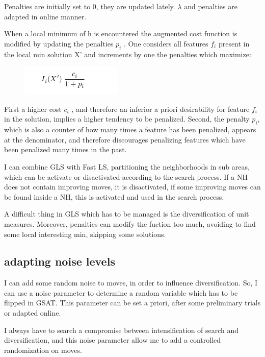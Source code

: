 \documentclass[11pt]{article}
\begin{document}
Penalties are initially set to 0, they are updated lately. $ \lambda $ and penalties are adapted in online manner. 

When a local minimum of h is encountered the augmented cost function is modified by updating the penalties $ p_i $ . One considers all features $ f_i $ present in the local min solution X' and increments by one the penalties which maximize:

\begin{figure}[H]
\includegraphics[scale=0.50]{penalties}
\centering
\end{figure}

First a higher cost $ c_i $ , and therefore an inferior a priori desirability for feature $ f_i $ in the solution, implies a higher tendency to be penalized.
Second, the penalty $ p_i $, which is also a counter of how many times a feature has been penalized, appears at the denominator, and therefore discourages penalizing features which have been penalized many times in the past.

I can combine GLS with Fast LS, partitioning the neighborhoods in sub areas, which can be activate or disactivated according to the search process. If a NH does not contain improving moves, it is disactivated, if some improving moves can be found inside a NH, this is activated and used in the search process. 

A difficult thing in GLS which has to be managed is the diversification of unit measures. Moreover, penalties can modify the fuction too much, avoiding to find some local interesting min, skipping some solutions.

\subsection{adapting noise levels}
I can add some random noise to moves, in order to influence diversification. So, I can use a noise parameter to determine a random variable which has to be flipped in GSAT. This parameter can be set a priori, after some preliminary trials or adapted online. 

I always have to search a compromise between intensification of search and diversification, and this noise parameter allow me to add a controlled randomization on moves.
\end{document}

